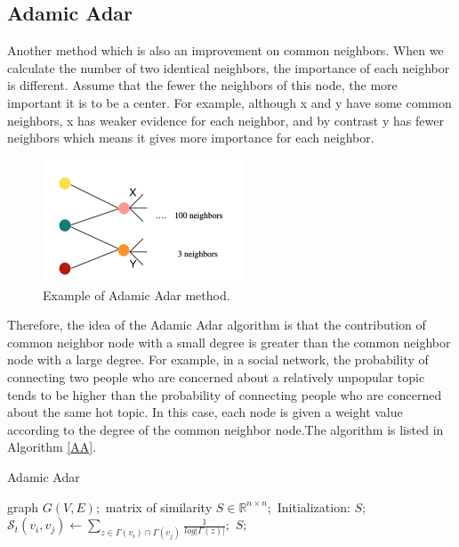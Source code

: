 \documentclass{article}
\begin{document}
\subsection{Adamic Adar}
Another method which is also an improvement on common neighbors. When we calculate the number of two identical neighbors, the importance of each neighbor is different. Assume that the fewer the neighbors of this node, the more important it is to be a center. For example, although x and y have some common neighbors, x has weaker evidence for each neighbor, and by contrast y has fewer neighbors which means it gives more importance for each neighbor. \\

\begin{figure}[h!]
	\includegraphics[width=6cm]{images/aa_nw.png}
	\centering
	\caption{Example of Adamic Adar method.}	\label{AA_NW}
\end{figure}

 Therefore, the idea of the Adamic Adar algorithm is that the contribution of common neighbor node with a small degree is greater than the common neighbor node with a large degree. For example, in a social network, the probability of connecting two people who are concerned about a relatively unpopular topic tends to be higher than the probability of connecting people who are concerned about the same hot topic. In this case, each node is given a weight value according to the degree of the common neighbor node.The algorithm is listed in Algorithm \ref{AA}.
 
 
 \begin{algorithm}[htb] 
 	\caption{Adamic Adar} 
 	\label{AA} 
 	\begin{algorithmic}
 		\REQUIRE  	graph $G(V,E);$
 		\ENSURE  matrix of similarity $S \in \mathbb{R}^{n \times n};$
 		\STATE Initialization: $S;$ 
 		\STATE$\mathcal{S}_t(v_i,v_j) \gets  \sum\limits_{z \in \Gamma(v_i)  \cap  \Gamma(v_j) }\frac{1}{ log| \Gamma(z)|};$
 		\ENDFOR
 		\ENDFOR
 		\RETURN $S;$
 	\end{algorithmic}
 \end{algorithm}
\end{document}
